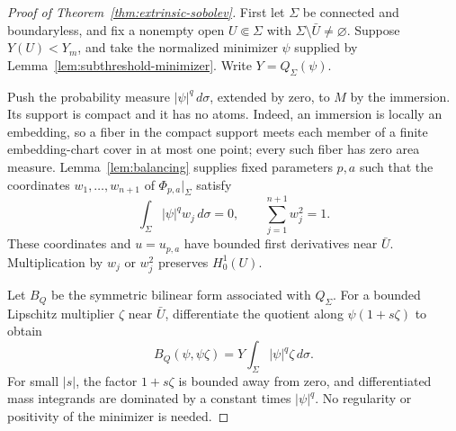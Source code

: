 \begin{proof}[Proof of Theorem~\ref{thm:extrinsic-sobolev}]
First let $\Sigma$ be connected and boundaryless, and fix a nonempty
open $U\Subset\Sigma$ with $\Sigma\setminus\bar U\ne\varnothing$.
Suppose $Y(U)<Y_m$, and take the normalized minimizer $\psi$ supplied
by Lemma~\ref{lem:subthreshold-minimizer}. Write $Y=Q_\Sigma(\psi)$.

Push the probability measure $|\psi|^q\,d\sigma$, extended by zero,
to $M$ by the immersion. Its support is compact and it has no atoms.
Indeed, an immersion is locally an embedding, so a fiber in the compact
support meets each member of a finite embedding-chart cover in at most
one point; every such fiber has zero area measure.
Lemma~\ref{lem:balancing} supplies fixed parameters $p,a$ such that
the coordinates $w_1,\ldots,w_{n+1}$ of $\Phi_{p,a}|_\Sigma$ satisfy
\begin{equation}
\label{eq:balanced-minimizer}
 \int_\Sigma|\psi|^q w_j\,d\sigma=0,\qquad
 \sum_{j=1}^{n+1}w_j^2=1.
\end{equation}
These coordinates and $u=u_{p,a}$ have bounded first derivatives
near $\bar U$. Multiplication by $w_j$ or $w_j^2$ preserves $H^1_0(U)$.

Let $B_Q$ be the symmetric bilinear form associated with $Q_\Sigma$.
For a bounded Lipschitz multiplier $\zeta$ near $\bar U$,
differentiate the quotient along $\psi(1+s\zeta)$ to obtain
\begin{equation}
\label{eq:minimizer-first-variation}
 B_Q(\psi,\psi\zeta)
 =Y\int_\Sigma|\psi|^q\zeta\,d\sigma.
\end{equation}
For small $|s|$, the factor $1+s\zeta$ is bounded away from zero,
and differentiated mass integrands are dominated by a constant times
$|\psi|^q$. No regularity or positivity of the minimizer is needed.


\end{proof}
